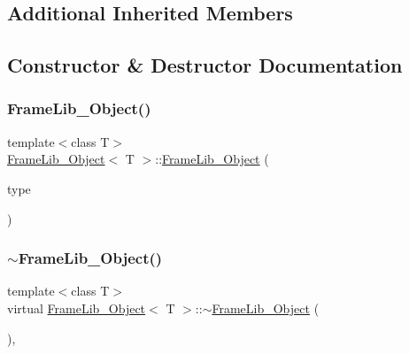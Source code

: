 \subsection*{Additional Inherited Members}


\subsection{Constructor \& Destructor Documentation}
\mbox{\label{class_frame_lib___object_a81d840729ed8fc0e86ec33969a5a5a85}} 
\subsubsection{\texorpdfstring{Frame\+Lib\+\_\+\+Object()}{FrameLib\_Object()}}
{\footnotesize\ttfamily template$<$class T$>$ \\
\hyperlink{class_frame_lib___object}{Frame\+Lib\+\_\+\+Object}$<$ T $>$\+::\hyperlink{class_frame_lib___object}{Frame\+Lib\+\_\+\+Object} (\begin{DoxyParamCaption}\item[{\hyperlink{_frame_lib___types_8h_a842c5e2e69277690b064bf363c017980}{Object\+Type}}]{type }\end{DoxyParamCaption})\hspace{0.3cm}{\ttfamily [inline]}}

\mbox{\label{class_frame_lib___object_ab88bcc3fe9e1c9da41a4afebb3d05005}} 
\subsubsection{\texorpdfstring{$\sim$\+Frame\+Lib\+\_\+\+Object()}{~FrameLib\_Object()}}
{\footnotesize\ttfamily template$<$class T$>$ \\
virtual \hyperlink{class_frame_lib___object}{Frame\+Lib\+\_\+\+Object}$<$ T $>$\+::$\sim$\hyperlink{class_frame_lib___object}{Frame\+Lib\+\_\+\+Object} (\begin{DoxyParamCaption}{ }\end{DoxyParamCaption})\hspace{0.3cm}{\ttfamily [inline]}, {\ttfamily [virtual]}}



